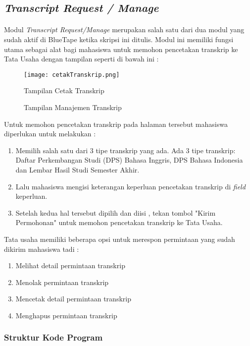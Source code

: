 \subsection{\textit{Transcript Request / Manage}}
\paragraph{} Modul \textit{Transcript Request/Manage} merupakan salah satu dari dua modul yang sudah aktif di BlueTape ketika skripsi ini ditulis. Modul ini memiliki fungsi utama sebagai alat bagi mahasiswa untuk memohon pencetakan transkrip ke Tata Usaha dengan tampilan seperti di bawah ini :
\begin{figure} [H]
	\centering  
	\texttt{[image: cetakTranskrip.png]}
	\caption[Tampilan Cetak Transkrip]{Tampilan Cetak Transkrip} 
\end{figure}
\begin{figure} [H]
	\centering  
	\caption[Tampilan Manajemen Transkrip]{Tampilan Manajemen Transkrip} 
\end{figure}
Untuk memohon pencetakan transkrip pada halaman tersebut mahasiswa diperlukan untuk melakukan :
\begin{enumerate}
  \item Memilih salah satu dari 3 tipe transkrip yang ada. Ada 3 tipe transkrip: Daftar Perkembangan Studi (DPS) Bahasa Inggris, DPS Bahasa Indonesia dan Lembar Hasil Studi Semester Akhir.
  \item Lalu mahasiswa mengisi keterangan keperluan pencetakan transkrip di \textit{field} keperluan.
  \item Setelah kedua hal tersebut dipilih dan diisi , tekan tombol "Kirim Permohonan" untuk memohon pencetakan transkrip ke Tata Usaha.
\end{enumerate}
Tata usaha memiliki beberapa opsi untuk merespon permintaan yang sudah dikirim mahasiswa tadi :
\begin{enumerate}
	\item Melihat detail permintaan transkrip
	\item Menolak permintaan transkrip
	\item Mencetak detail permintaan transkrip
	\item Menghapus permintaan transkrip
\end{enumerate}
\subsubsection{Struktur Kode Program}
